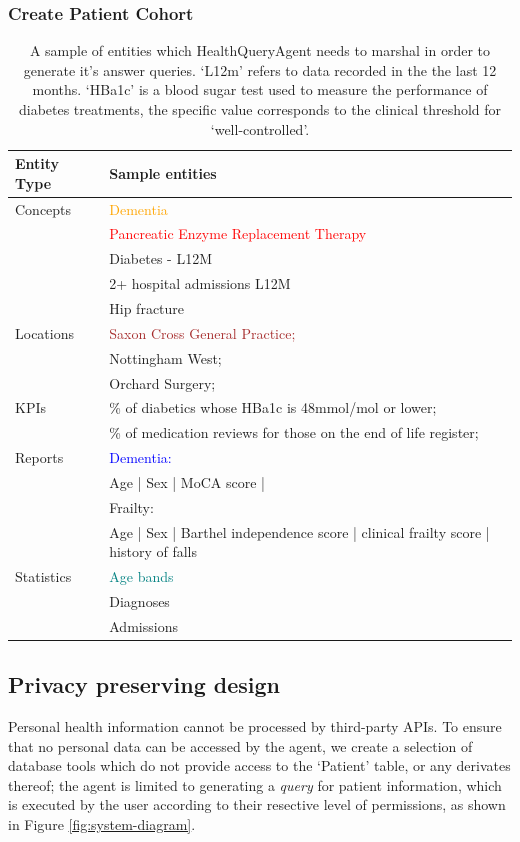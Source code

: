 \documentclass[11pt]{article}
\begin{document}
\subsubsection{Create Patient Cohort}

\begin{table}[t]
\centering
	\begin{tabular}{|p{2cm}|p{5cm}|}
\hline
	Entity Type & Sample entities \\

\hline
\hline
	Concepts 	& \textcolor{orange}{Dementia} \\
			& \textcolor{red}{Pancreatic Enzyme Replacement Therapy} \\
			& Diabetes - L12M \\
			& 2+ hospital admissions L12M \\
			& Hip fracture \\ 
\hline
	Locations	& \textcolor{brown}{Saxon Cross General Practice;}\\	
			& Nottingham West; \\
			& Orchard Surgery; \\
\hline
	KPIs		& \% of diabetics whose HBa1c is 48mmol/mol or lower; \\
	 		& \% of medication reviews for those on the end of life register; \\	
\hline
	Reports		& \textcolor{blue}{Dementia:} \\
			& Age | Sex | MoCA score | \\
			& Frailty: \\
			& Age | Sex | Barthel independence score | clinical frailty score | history of falls \\
\hline
	Statistics	& \textcolor{teal}{Age bands} \\
			& Diagnoses \\
			& Admissions \\
\hline
\end{tabular}

\caption{
	A sample of entities which HealthQueryAgent needs to marshal in order to generate it's answer queries.
	`L12m' refers to data recorded in the the last 12 months.
	`HBa1c' is a blood sugar test used to measure the performance of diabetes treatments, the specific value corresponds to the clinical threshold for `well-controlled'.
}
	\label{tab:sample-entities}
\end{table}


\subsection{Privacy preserving design}
Personal health information cannot be processed by third-party APIs.
To ensure that no personal data can be accessed by the agent, we create a selection of database tools which do not provide access to the `Patient' table, or any derivates thereof; the agent is limited to generating a \textit{query} for patient information, which is executed by the user according to their resective level of permissions, as shown in Figure \ref{fig:system-diagram}.
\end{document}

